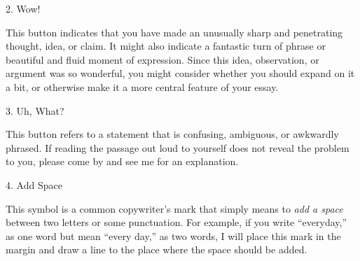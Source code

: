  \begin{center}

\bigskip


{\huge 2. Wow!} \end{center}

This button indicates that you have made an unusually sharp and penetrating
thought, idea, or claim. It might also indicate a fantastic turn of phrase or
beautiful and fluid moment of expression. Since this idea, observation, or
argument was so wonderful, you might consider whether you should expand on it a
bit, or otherwise make it a more central feature of your essay.

 \begin{center}

\bigskip


{\huge 3. Uh, What?} \end{center}

This button refers to a statement that is confusing, ambiguous, or awkwardly
phrased. If reading the passage out loud to yourself does not reveal the problem
to you, please come by and see me for an explanation.

 \begin{center}
\bigskip

{\huge 4. Add Space} \end{center}

This symbol is a common copywriter’s mark that simply means to \emph{add a
space} between two letters or some punctuation. For example, if you write
“everyday,” as one word but mean “every day,” as two words, I will place this
mark in the margin and draw a line to the place where the space should be added.


